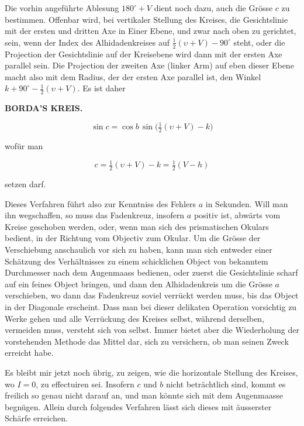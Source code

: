 \par\indent Die vorhin angeführte Ablesung $180^\circ+V$ dient noch dazu, auch die Grösse $c$ zu bestimmen. Offenbar wird, bei vertikaler Stellung des Kreises, die Gesichtslinie mit der ersten und dritten Axe in Einer Ebene, und zwar nach oben zu gerichtet, sein, wenn der Index des Alhidadenkreises auf $\tfrac{1}{2}(\upsilon+V)-90^\circ$ steht, oder die Projection der Gesichtslinie auf der Kreisebene wird dann mit der ersten Axe parallel sein. Die Projection der zweiten Axe (linker Arm) auf eben dieser Ebene macht also mit dem Radius, der der ersten Axe parallel ist, den Winkel $k+90^\circ-\tfrac{1}{2}(\upsilon+V)$. Es ist daher

\clearpage
\noindent{}%
%
\parbox[t]{\dimexpr\linewidth-24mm\relax}{\centering\footnotesize\bfseries BORDA’S KREIS.\par}%
\makebox[12mm][r]{}\par\nobreak\medskip
\noindent \[ \sin c = \cos b\,\sin\bigl(\tfrac{1}{2}(\upsilon+V)-k\bigr) \]

\noindent wofür man

\[ c = \tfrac{1}{2}(\upsilon+V)-k = \tfrac{1}{2}(V-h) \]

\noindent setzen darf.

\par\indent Dieses Verfahren führt also zur Kenntniss des Fehlers $a$ in Sekunden. Will man ihn wegschaffen, so muss das Fadenkreuz, insofern $a$ positiv ist, abwärts vom Kreise geschoben werden, oder, wenn man sich des prismatischen Okulars bedient, in der Richtung vom Objectiv zum Okular. Um die Grösse der Verschiebung anschaulich vor sich zu haben, kann man sich entweder einer Schätzung des Verhältnisses zu einem schicklichen Object von bekanntem Durchmesser nach dem Augenmaass bedienen, oder zuerst die Gesichtslinie scharf auf ein feines Object bringen, und dann den Alhidadenkreis um die Grösse $a$ verschieben, wo dann das Fadenkreuz soviel verrückt werden muss, bis das Object in der Diagonale erscheint. Dass man bei dieser delikaten Operation vorsichtig zu Werke gehen und alle Verrückung des Kreises selbst, während derselben, vermeiden muss, versteht sich von selbst. Immer bietet aber die Wiederholung der vorstehenden Methode das Mittel dar, sich zu versichern, ob man seinen Zweck erreicht habe.

\par\indent Es bleibt mir jetzt noch übrig, zu zeigen, wie die horizontale Stellung des Kreises, wo $I=0$, zu effectuiren sei. Insofern $c$ und $b$ nicht beträchtlich sind, kommt es freilich so genau nicht darauf an, und man könnte sich mit dem Augenmaasse begnügen. Allein durch folgendes Verfahren lässt sich dieses mit äusserster Schärfe erreichen.

